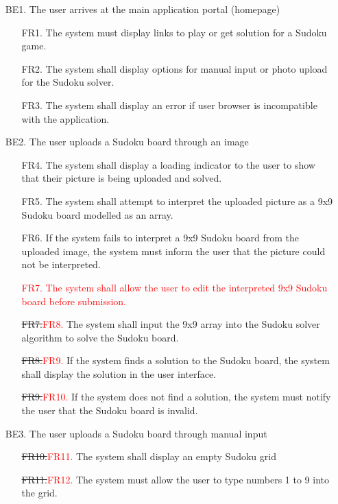 \documentclass[11pt]{article}
\begin{document}
\begin{enumerate}
    \item [BE1.] The user arrives at the main application portal (homepage)
    \begin{enumerate}
        \item [FR1.] The system must display links to play or get solution for a Sudoku game.
        \item [FR2.] The system shall display options for manual input or photo upload for the Sudoku solver.
        \item [FR3.] The system shall display an error if user browser is incompatible with the application.
    \end{enumerate}
    \item [BE2.] The user uploads a Sudoku board through an image
    \begin{enumerate}
        \item [FR4.] The system shall display a loading indicator to the user to show that their picture is being uploaded and solved.
        \item [FR5.] The system shall attempt to interpret the uploaded picture as a 9x9 Sudoku board modelled as an array.
        \item [FR6.] If the system fails to interpret a 9x9 Sudoku board from the uploaded image, the system must inform the user that the picture could not be interpreted.
        \item [\textcolor{red}{FR7.}]\textcolor{red}{The system shall allow the user to edit the interpreted 9x9 Sudoku board before submission.}
        \item [\sout{FR7.}\textcolor{red}{FR8.}] The system shall input the 9x9 array into the Sudoku solver algorithm to solve the Sudoku board.
        \item [\sout{FR8.}\textcolor{red}{FR9.}] If the system finds a solution to the Sudoku board, the system shall display the solution in the user interface.
        \item [\sout{FR9.}\textcolor{red}{FR10.}] If the system does not find a solution, the system must notify the user that the Sudoku board is invalid.
    \end{enumerate}
    \item [BE3.] The user uploads a Sudoku board through manual input
    \begin{enumerate}
        \item [\sout{FR10.}\textcolor{red}{FR11.}] The system shall display an empty Sudoku grid
        \item [\sout{FR11.}\textcolor{red}{FR12.}] The system must allow the user to type numbers 1 to 9 into the grid.

\end{enumerate}
\end{enumerate}
\end{document}
